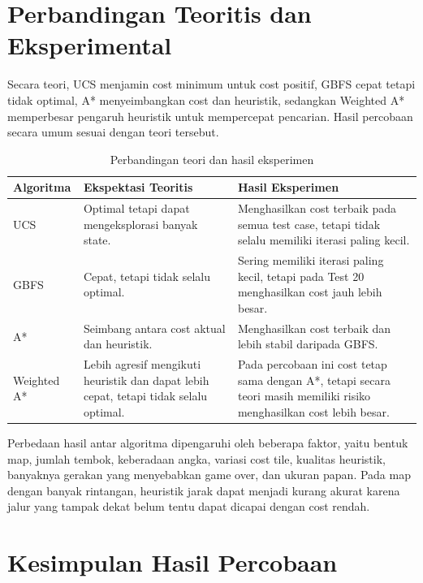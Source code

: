 \section{Perbandingan Teoritis dan Eksperimental}

Secara teori, UCS menjamin cost minimum untuk cost positif, GBFS cepat tetapi tidak optimal, A* menyeimbangkan cost dan heuristik, sedangkan Weighted A* memperbesar pengaruh heuristik untuk mempercepat pencarian. 
Hasil percobaan secara umum sesuai dengan teori tersebut.

\begin{table}[H]
	\centering
	\caption{Perbandingan teori dan hasil eksperimen}
	\begin{tabular}{|p{3cm}|p{5cm}|p{6cm}|}
		\hline
		\rowcolor{gray!20}
		\textbf{Algoritma} & \textbf{Ekspektasi Teoritis} & \textbf{Hasil Eksperimen} \\
		\hline
		UCS & Optimal tetapi dapat mengeksplorasi banyak state. & Menghasilkan cost terbaik pada semua test case, tetapi tidak selalu memiliki iterasi paling kecil. \\
		\hline
		GBFS & Cepat, tetapi tidak selalu optimal. & Sering memiliki iterasi paling kecil, tetapi pada Test 20 menghasilkan cost jauh lebih besar. \\
		\hline
		A* & Seimbang antara cost aktual dan heuristik. & Menghasilkan cost terbaik dan lebih stabil daripada GBFS. \\
		\hline
		Weighted A* & Lebih agresif mengikuti heuristik dan dapat lebih cepat, tetapi tidak selalu optimal. & Pada percobaan ini cost tetap sama dengan A*, tetapi secara teori masih memiliki risiko menghasilkan cost lebih besar. \\
		\hline
	\end{tabular}
\end{table}

\begin{tcolorbox}[
	colback=gray!5,
	colframe=black!60,
	title=\textbf{Faktor Penyebab Perbedaan Hasil},
	arc=2mm,
	boxrule=0.8pt
]
Perbedaan hasil antar algoritma dipengaruhi oleh beberapa faktor, yaitu bentuk map, jumlah tembok, keberadaan angka, variasi cost tile, kualitas heuristik, banyaknya gerakan yang menyebabkan game over, dan ukuran papan. 
Pada map dengan banyak rintangan, heuristik jarak dapat menjadi kurang akurat karena jalur yang tampak dekat belum tentu dapat dicapai dengan cost rendah.
\end{tcolorbox}


\section{Kesimpulan Hasil Percobaan}


